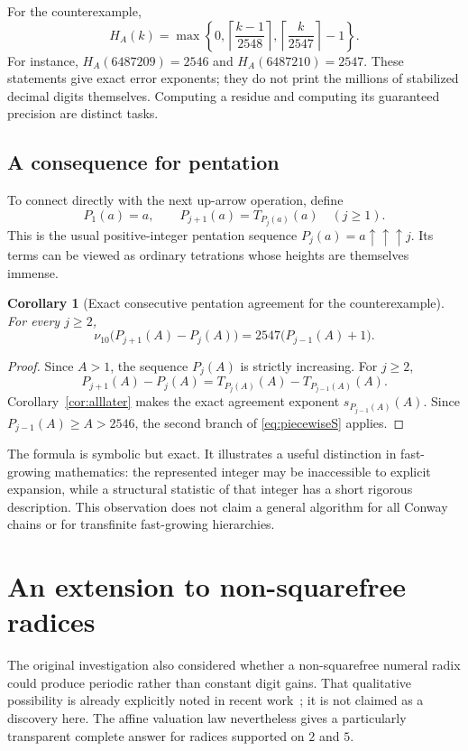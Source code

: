 \documentclass[11pt,a4paper]{article}
\newtheorem{corollary}[theorem]{Corollary}
\theoremstyle{definition}
\theoremstyle{remark}
\newcommand{\ceil}[1]{\left\lceil #1\right\rceil}
\begin{document}
For the counterexample,
\[
 H_A(k)=\max\left\{0,\ceil{\frac{k-1}{2548}},
 \ceil{\frac{k}{2547}}-1\right\}.
\]
For instance, $H_A(6487209)=2546$ and $H_A(6487210)=2547$. These statements give exact error exponents; they do not print the millions of stabilized decimal digits themselves. Computing a residue and computing its guaranteed precision are distinct tasks.

\subsection{A consequence for pentation}
To connect directly with the next up-arrow operation, define
\[
 P_1(a)=a,\qquad P_{j+1}(a)=T_{P_j(a)}(a)\quad(j\ge1).
\]
This is the usual positive-integer pentation sequence $P_j(a)=a\uparrow\uparrow\uparrow j$. Its terms can be viewed as ordinary tetrations whose heights are themselves immense.

\begin{corollary}[Exact consecutive pentation agreement for the counterexample]\label{cor:pentation}
For every $j\ge2$,
\begin{equation}\label{eq:pentation}
 \nu_{10}\bigl(P_{j+1}(A)-P_j(A)\bigr)
 =2547\bigl(P_{j-1}(A)+1\bigr).
\end{equation}
\end{corollary}
\begin{proof}
Since $A>1$, the sequence $P_j(A)$ is strictly increasing. For $j\ge2$,
\[
 P_{j+1}(A)-P_j(A)
 =T_{P_j(A)}(A)-T_{P_{j-1}(A)}(A).
\]
Corollary~\ref{cor:alllater} makes the exact agreement exponent $s_{P_{j-1}(A)}(A)$. Since $P_{j-1}(A)\ge A>2546$, the second branch of \eqref{eq:piecewiseS} applies.
\end{proof}

The formula is symbolic but exact. It illustrates a useful distinction in fast-growing mathematics: the represented integer may be inaccessible to explicit expansion, while a structural statistic of that integer has a short rigorous description. This observation does not claim a general algorithm for all Conway chains or for transfinite fast-growing hierarchies.

\section{An extension to non-squarefree radices}
\label{sec:radices}
The original investigation also considered whether a non-squarefree numeral radix could produce periodic rather than constant digit gains. That qualitative possibility is already explicitly noted in recent work~\cite{Ripa2026}; it is not claimed as a discovery here. The affine valuation law nevertheless gives a particularly transparent complete answer for radices supported on $2$ and $5$.
\end{document}
